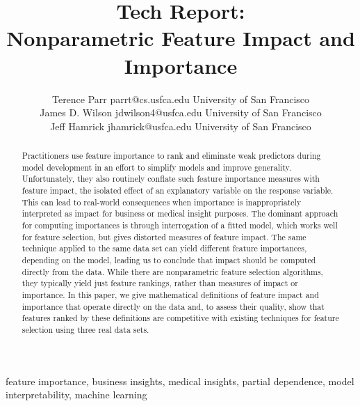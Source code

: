 \documentclass[11pt]{article}
\newcommand{\todo}[1]{{{\small\color{red}{[#1]}}}}
\begin{document}
\def\spacingset#1{\renewcommand{\baselinestretch}%
{#1}\small\normalsize} \spacingset{1}



\title{\bf Tech Report:\\
Nonparametric Feature Impact and Importance}

\author{Terence Parr \email parrt@cs.usfca.edu
\addr University of San Francisco\\
\AND James D. Wilson \email jdwilson4@usfca.edu
\addr University of San Francisco\\
\AND Jeff Hamrick \email jhamrick@usfca.edu
      \addr University of San Francisco}

\maketitle

\begin{abstract}%
Practitioners use feature importance to rank and eliminate weak predictors during model development in an effort to simplify models and improve generality.  Unfortunately, they also routinely conflate such feature importance measures with feature impact, the isolated effect of an explanatory variable on the response variable.   This can lead to real-world consequences when importance is inappropriately interpreted as impact for business or medical insight purposes. The dominant approach for computing importances is through interrogation of a fitted model, which works well for feature selection, but gives distorted measures of feature impact. The same technique applied to the same data set can yield different feature importances, depending on the model, leading us to conclude that impact should be computed directly from the data.  While there are nonparametric feature selection algorithms, they typically yield just feature rankings, rather than measures of impact or importance. In this paper, we give mathematical definitions of feature impact and importance that operate directly on the data and, to assess their quality, show that features ranked by these definitions are competitive with existing techniques for feature selection using three real data sets. \todo{should we reference shap, permutation importance, mRMR in abstract?}
\end{abstract}

\begin{keywords}
feature importance, business insights, medical insights, partial dependence, model interpretability, machine learning
\end{keywords}
\end{document}

